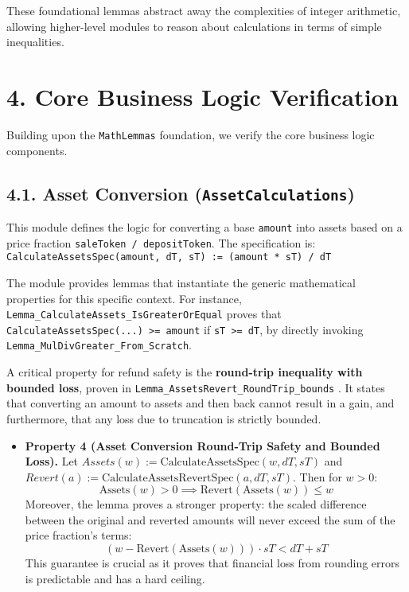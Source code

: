 \documentclass[
  english,
  onecolumn]{article}
\providecommand{\tightlist}{%
  \setlength{\itemsep}{0pt}\setlength{\parskip}{0pt}}
\begin{document}
These foundational lemmas abstract away the complexities of integer
arithmetic, allowing higher-level modules to reason about calculations
in terms of simple inequalities.

\section{4. Core Business Logic
Verification}\label{core-business-logic-verification}

Building upon the \texttt{MathLemmas} foundation, we verify the core
business logic components.

\subsection{\texorpdfstring{4.1. Asset Conversion
(\texttt{AssetCalculations})}{4.1. Asset Conversion (AssetCalculations)}}\label{asset-conversion-assetcalculations}

This module defines the logic for converting a base \texttt{amount} into
assets based on a price fraction \texttt{saleToken\ /\ depositToken}.
The specification is:
\texttt{CalculateAssetsSpec(amount,\ dT,\ sT)\ :=\ (amount\ *\ sT)\ /\ dT}

The module provides lemmas that instantiate the generic mathematical
properties for this specific context. For instance,
\texttt{Lemma\_CalculateAssets\_IsGreaterOrEqual} proves that
\texttt{CalculateAssetsSpec(...)\ \textgreater{}=\ amount} if
\texttt{sT\ \textgreater{}=\ dT}, by directly invoking
\texttt{Lemma\_MulDivGreater\_From\_Scratch}.

A critical property for refund safety is the \textbf{round-trip
inequality with bounded loss}, proven in
\texttt{Lemma\_AssetsRevert\_RoundTrip\_bounds}
\citep{bhargavan2016formal}. It states that converting an amount to
assets and then back cannot result in a gain, and furthermore, that any
loss due to truncation is strictly bounded.

\begin{itemize}
\tightlist
\item
  \textbf{Property 4 (Asset Conversion Round-Trip Safety and Bounded
  Loss).} Let \(Assets(w) := \text{CalculateAssetsSpec}(w, dT, sT)\) and
  \(Revert(a) := \text{CalculateAssetsRevertSpec}(a, dT, sT)\). Then for
  \(w > 0\):
  \[ \text{Assets}(w) > 0 \implies \text{Revert}(\text{Assets}(w)) \le w \]
  Moreover, the lemma proves a stronger property: the scaled difference
  between the original and reverted amounts will never exceed the sum of
  the price fraction's terms:
  \[ (w - \text{Revert}(\text{Assets}(w))) \cdot sT < dT + sT \] This
  guarantee is crucial as it proves that financial loss from rounding
  errors is predictable and has a hard ceiling.
\end{itemize}
\end{document}
